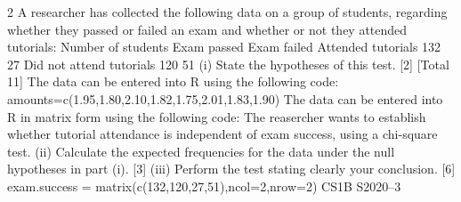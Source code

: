 \documentclass[a4paper,12pt]{article}
\begin{document}
\large 
\noindent

2 A researcher has collected the following data on a group of students, regarding
whether they passed or failed an exam and whether or not they attended tutorials:
Number of students Exam passed Exam failed
Attended tutorials 132 27
Did not attend tutorials 120 51
(i) State the hypotheses of this test. [2]
[Total 11]
The data can be entered into R using the following code:
amounts=c(1.95,1.80,2.10,1.82,1.75,2.01,1.83,1.90)
The data can be entered into R in matrix form using the following code:
The reasercher wants to establish whether tutorial attendance is independent of exam
success, using a chi-square test.
(ii) Calculate the expected frequencies for the data under the null hypotheses
in part (i). [3]
(iii) Perform the test stating clearly your conclusion. [6]
exam.success = matrix(c(132,120,27,51),ncol=2,nrow=2)
CS1B S2020–3
\end{document}
